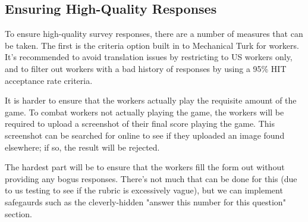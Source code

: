 	\subsection{Ensuring High-Quality Responses}
		To ensure high-quality survey responses, there are a number of measures that can be taken. The first is the criteria option built in to Mechanical Turk for workers. It's recommended to avoid translation issues by restricting to US workers only, and to filter out workers with a bad history of responses by using a 95\% HIT acceptance rate criteria.

		It is harder to ensure that the workers actually play the requisite amount of the game. To combat workers not actually playing the game, the workers will be required to upload a screenshot of their final score playing the game. This screenshot can be searched for online to see if they uploaded an image found elsewhere; if so, the result will be rejected.

		The hardest part will be to ensure that the workers fill the form out without providing any bogus responses. There's not much that can be done for this (due to us testing to see if the rubric is excessively vague), but we can implement safegaurds such as the cleverly-hidden "answer this number for this question" section.